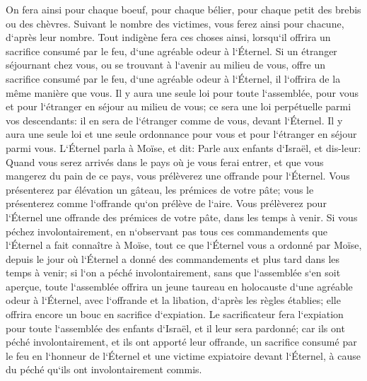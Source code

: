\verse On fera ainsi pour chaque boeuf, pour chaque bélier, pour chaque petit des brebis ou des chèvres. 
\verse Suivant le nombre des victimes, vous ferez ainsi pour chacune, d`après leur nombre. 
\verse Tout indigène fera ces choses ainsi, lorsqu`il offrira un sacrifice consumé par le feu, d`une agréable odeur à l`Éternel. 
\verse Si un étranger séjournant chez vous, ou se trouvant à l`avenir au milieu de vous, offre un sacrifice consumé par le feu, d`une agréable odeur à l`Éternel, il l`offrira de la même manière que vous. 
\verse Il y aura une seule loi pour toute l`assemblée, pour vous et pour l`étranger en séjour au milieu de vous; ce sera une loi perpétuelle parmi vos descendants: il en sera de l`étranger comme de vous, devant l`Éternel. 
\verse Il y aura une seule loi et une seule ordonnance pour vous et pour l`étranger en séjour parmi vous. 
\verse L`Éternel parla à Moïse, et dit: 
\verse Parle aux enfants d`Israël, et dis-leur: Quand vous serez arrivés dans le pays où je vous ferai entrer, 
\verse et que vous mangerez du pain de ce pays, vous prélèverez une offrande pour l`Éternel. 
\verse Vous présenterez par élévation un gâteau, les prémices de votre pâte; vous le présenterez comme l`offrande qu`on prélève de l`aire. 
\verse Vous prélèverez pour l`Éternel une offrande des prémices de votre pâte, dans les temps à venir. 
\verse Si vous péchez involontairement, en n`observant pas tous ces commandements que l`Éternel a fait connaître à Moïse, 
\verse tout ce que l`Éternel vous a ordonné par Moïse, depuis le jour où l`Éternel a donné des commandements et plus tard dans les temps à venir; 
\verse si l`on a péché involontairement, sans que l`assemblée s`en soit aperçue, toute l`assemblée offrira un jeune taureau en holocauste d`une agréable odeur à l`Éternel, avec l`offrande et la libation, d`après les règles établies; elle offrira encore un bouc en sacrifice d`expiation. 
\verse Le sacrificateur fera l`expiation pour toute l`assemblée des enfants d`Israël, et il leur sera pardonné; car ils ont péché involontairement, et ils ont apporté leur offrande, un sacrifice consumé par le feu en l`honneur de l`Éternel et une victime expiatoire devant l`Éternel, à cause du péché qu`ils ont involontairement commis. 
